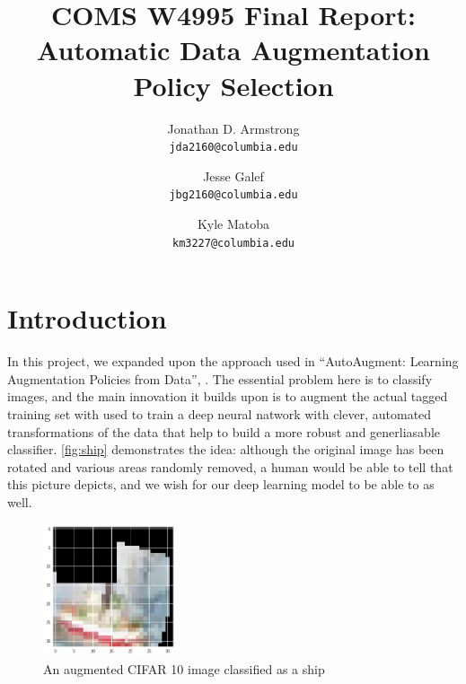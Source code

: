 \documentclass[10pt,twocolumn,letterpaper]{article}
\begin{document}
\title{COMS W4995 Final Report: Automatic Data Augmentation Policy Selection}
\author{Jonathan D. Armstrong\\
{\tt\small jda2160@columbia.edu}
\and
Jesse Galef\\
{\tt\small jbg2160@columbia.edu}
\and
Kyle Matoba\\
{\tt\small km3227@columbia.edu}
}

\maketitle


\section{Introduction}

  In this project, we expanded upon the approach used in ``AutoAugment: Learning Augmentation Policies from Data'', \cite{Cubuk2018}. The essential problem here is to classify images, and the main innovation it builds upon is to augment the actual tagged training set with used to train a deep neural natwork with clever, automated transformations of the data that help to build a more robust and generliasable classifier. \autoref{fig:ship} demonstrates the idea: although the original image has been rotated and various areas randomly removed, a human would be able to tell that this picture depicts, and we wish for our deep learning model to be able to as well.

  \begin{figure}[h]
    \begin{center}
      \includegraphics[width=0.35\textwidth]{ship.png}
    \end{center}
    \caption{An augmented CIFAR 10 image classified as a ship}
    \label{fig:ship}
  \end{figure}
\end{document}

